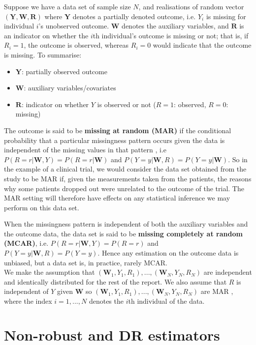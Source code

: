 \documentclass[12pt,twoside]{article}
\begin{document}
Suppose we have a data set of sample size $N$, and realisations of random vector $(\mathbf{Y}, \mathbf{W}, \mathbf{R})$ where $\mathbf{Y}$ denotes a partially denoted outcome, i.e. $Y_i$ is missing for individual $i$'s unobserved outcome. $\mathbf{W}$ denotes the auxiliary variables, and $\mathbf{R}$ is an indicator on whether the $i$th individual's outcome is missing or not; that is, if $R_i = 1$, the outcome is observed, whereas $R_i = 0$ would indicate that the outcome is missing.
To summarise:
\begin{itemize}
    \item $\mathbf{Y}$: partially observed outcome 
    \item $\mathbf{W}$: auxiliary variables/covariates 
    \item $\mathbf{R}$: indicator on whether $Y$ is observed or not ($R = 1$: observed, $R = 0$: missing) 
\end{itemize}

The outcome is said to be \textbf{missing at random (MAR)} if the conditional probability that a particular missingness pattern occurs given the data is independent of the missing values in that pattern \citep{vansteelandt}, i.e $P(R=r|\mathbf{W}, Y) = P(R= r|\mathbf{W})$ and  $P(Y=y|\mathbf{W}, R) = P(Y=y|\mathbf{W})$. So in the example of a clinical trial, we would consider the data set obtained from the study to be MAR if, given the measurements taken from the patients, the reasons why some patients dropped out were unrelated to the outcome of the trial. The MAR setting will therefore have effects on any statistical inference we may perform on this data set.

When the missingness pattern is independent of both the auxiliary variables and the outcome data, the data set is said to be \textbf{missing completely at random (MCAR)}, i.e. $P(R=r|\mathbf{W}, Y) = P(R = r)$ and  $P(Y=y|\mathbf{W}, R) = P(Y=y)$. Hence any estimation on the outcome data is unbiased, but a data set is, in practice, rarely MCAR.\\

We make the assumption that $(\mathbf{W}_1, Y_1, R_1),...,(\mathbf{W}_N, Y_N, R_N)$ are independent and identically distributed for the rest of the report. We also assume that $R$ is independent of $Y$ given $\mathbf{W}$ so $(\mathbf{W}_1, Y_1, R_1), ... ,(\mathbf{W}_N, Y_N, R_N)$ are MAR \citep{vansteelandt}, where the index $i = 1,...,N$ denotes the $i$th individual of the data.\\

\section{Non-robust and DR estimators}
\end{document}
